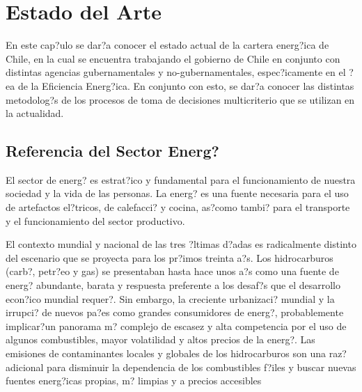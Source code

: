 

\chapter{Estado del Arte}
\label{ch:eda}

En este cap?ulo se dar?a conocer el estado actual de la cartera energ?ica de Chile, en la cual se encuentra trabajando el gobierno de Chile en conjunto con distintas agencias gubernamentales y no-gubernamentales, espec?icamente en el ?ea de la Eficiencia Energ?ica. En conjunto con esto, se dar?a conocer las distintas metodolog?s de los procesos de toma de decisiones multicriterio que se utilizan en la actualidad.

\section{Referencia del Sector Energ?}
El sector de energ? es estrat?ico y fundamental para el funcionamiento de nuestra sociedad y la vida de las personas. La energ? es una fuente necesaria para el uso de artefactos el?tricos, de calefacci? y cocina, as?como tambi? para el transporte y el funcionamiento del sector productivo.


El contexto mundial y nacional de las tres ?ltimas d?adas es radicalmente distinto del
escenario que se proyecta para los pr?imos treinta a?s. Los hidrocarburos (carb?, petr?eo y gas) se presentaban hasta hace unos a?s como una fuente de energ? abundante, barata y respuesta preferente a los desaf?s que el desarrollo econ?ico mundial requer?. Sin embargo, la creciente urbanizaci? mundial y la irrupci? de nuevos pa?es como grandes consumidores de energ?, probablemente implicar?un panorama m? complejo de escasez y alta competencia por el uso de algunos combustibles, mayor volatilidad y altos precios de la energ?. Las emisiones de contaminantes locales y globales de los hidrocarburos son una raz? adicional para disminuir la dependencia de los combustibles f?iles y buscar nuevas fuentes energ?icas propias, m? limpias y a precios accesibles

